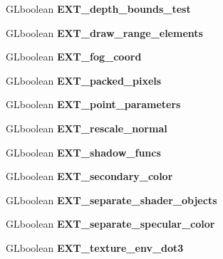 \begin{DoxyCompactItemize}
G\+Lboolean {\bfseries E\+X\+T\+\_\+depth\+\_\+bounds\+\_\+test}
\item 
\mbox{\label{structgl__extensions_a76515036971743089b49a1932f7a281e}} 
G\+Lboolean {\bfseries E\+X\+T\+\_\+draw\+\_\+range\+\_\+elements}
\item 
\mbox{\label{structgl__extensions_a4f7f2a8eba7189d67b76f38df7396ce9}} 
G\+Lboolean {\bfseries E\+X\+T\+\_\+fog\+\_\+coord}
\item 
\mbox{\label{structgl__extensions_ac5a44c0948523815b05a796b4640936c}} 
G\+Lboolean {\bfseries E\+X\+T\+\_\+packed\+\_\+pixels}
\item 
\mbox{\label{structgl__extensions_a4734ee9719c8e603aac21a98d4f30336}} 
G\+Lboolean {\bfseries E\+X\+T\+\_\+point\+\_\+parameters}
\item 
\mbox{\label{structgl__extensions_ac27ebc004cda4a07aa547792cb31c456}} 
G\+Lboolean {\bfseries E\+X\+T\+\_\+rescale\+\_\+normal}
\item 
\mbox{\label{structgl__extensions_abe34e46872394d1d9ac2c2d072afdc1e}} 
G\+Lboolean {\bfseries E\+X\+T\+\_\+shadow\+\_\+funcs}
\item 
\mbox{\label{structgl__extensions_a689455a5ad868bde29a33d789b07f577}} 
G\+Lboolean {\bfseries E\+X\+T\+\_\+secondary\+\_\+color}
\item 
\mbox{\label{structgl__extensions_a2b55133a58d7135a337996d35ed08be2}} 
G\+Lboolean {\bfseries E\+X\+T\+\_\+separate\+\_\+shader\+\_\+objects}
\item 
\mbox{\label{structgl__extensions_a4b8f27b634894564a5467cf674e1fa68}} 
G\+Lboolean {\bfseries E\+X\+T\+\_\+separate\+\_\+specular\+\_\+color}
\item 
\mbox{\label{structgl__extensions_a1985061c5f0144ca784572636244c781}} 
G\+Lboolean {\bfseries E\+X\+T\+\_\+texture\+\_\+env\+\_\+dot3}
\item 
\mbox{\label{structgl__extensions_afd0748f3655737799701b2d0c1870fde}} 

\end{DoxyCompactItemize}
